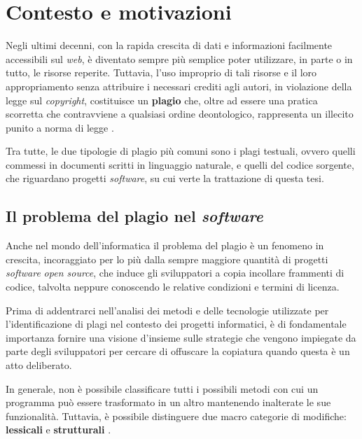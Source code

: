 \chapter{Contesto e motivazioni}
\label{chapter:context-and-motivations}

Negli ultimi decenni, con la rapida crescita di dati e informazioni facilmente accessibili sul \textit{web}, è diventato sempre più semplice poter utilizzare, in parte o in tutto, le risorse reperite.
%
Tuttavia, l'uso improprio di tali risorse e il loro appropriamento senza attribuire i necessari crediti agli autori, in violazione della legge sul \textit{copyright}, costituisce un \textbf{plagio} \cite{britannica} che, oltre ad essere una pratica scorretta che contravviene a qualsiasi ordine deontologico, rappresenta un illecito punito a norma di legge \cite{copyright-law-italia}.

Tra tutte, le due tipologie di plagio più comuni sono i plagi testuali, ovvero quelli commessi in documenti scritti in linguaggio naturale, e quelli del codice sorgente, che riguardano progetti \textit{software}, su cui verte la trattazione di questa tesi.

\section{Il problema del plagio nel \textit{software}}
Anche nel mondo dell'informatica il problema del plagio è un fenomeno in crescita, incoraggiato per lo più dalla sempre maggiore quantità di progetti \textit{software} \textit{open source}, che induce gli sviluppatori a copia incollare frammenti di codice, talvolta neppure conoscendo le relative condizioni e termini di licenza.

Prima di addentrarci nell'analisi dei metodi e delle tecnologie utilizzate per l'identificazione di plagi nel contesto dei progetti informatici, è di fondamentale importanza fornire una visione d'insieme sulle strategie che vengono impiegate da parte degli sviluppatori per cercare di offuscare la copiatura quando questa è un atto deliberato.

In generale, non è possibile classificare tutti i possibili metodi con cui un programma può essere trasformato in un altro mantenendo inalterate le sue funzionalità.
%
Tuttavia, è possibile distinguere due macro categorie di modifiche: \textbf{lessicali} e \textbf{strutturali} \cite{joy-99}.

